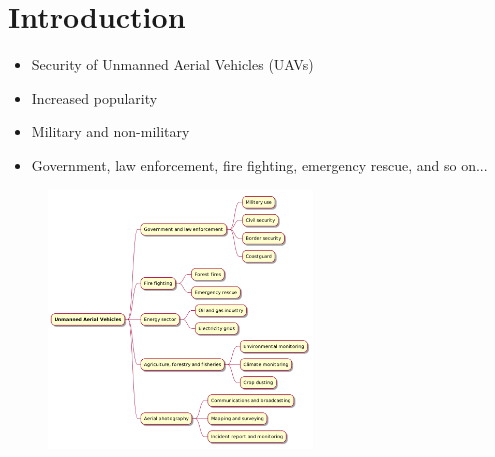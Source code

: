 \section{Introduction}
\begin{frame}{\insertsection}
    \begin{itemize}
        \item Security of Unmanned Aerial Vehicles (UAVs)
        \item Increased popularity
        \item Military and non-military
    \end{itemize}
\end{frame}

\begin{frame}{\insertsection}
    \begin{itemize}
        \item Government, law enforcement, fire fighting, emergency rescue, and so on...
    \end{itemize}
    
    \begin{figure}[h]
        \centering
        \includegraphics[width=7cm]{img/usage.png}
        \label{fig:usage}
    \end{figure}
\end{frame}

